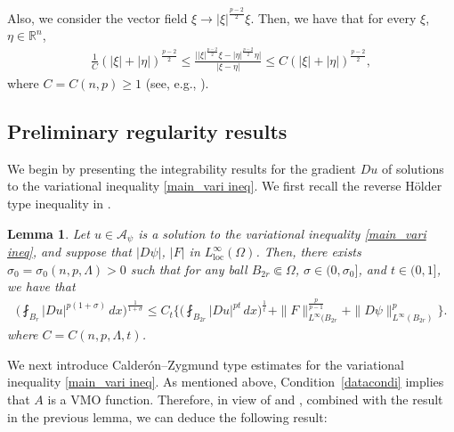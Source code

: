\documentclass[reqno]{amsart}
\numberwithin{equation}{section}
\theoremstyle{plain}
\newtheorem{lemma}[theorem]{Lemma}
\theoremstyle{definition}
\theoremstyle{remark}
\DeclareMathOperator{\loc}{loc}
\providecommand{\Biggset}[1]{\Biggl\{#1\Biggr\}}
\providecommand{\abs}[1]{\lvert#1\rvert}
\newcommand{\bR}{\mathbb{R}}
\begin{document}
Also, we consider the vector field $\xi \to \abs{\xi}^{\frac{p-2}{2}}\xi$. Then, we have that for every $\xi$, $\eta\in \bR^n$,
 \begin{align}\label{eq0130fri4}
 \frac{1}{C} (\abs{\xi}+\abs{\eta})^{\frac{p-2}{2}} \leq \frac{\big|\abs{\xi}^{\frac{p-2}{2}}\xi-\abs{\eta}^{\frac{p-2}{2}}\eta\big|}{\abs{\xi-\eta}}\leq C(\abs{\xi}+\abs{\eta})^{\frac{p-2}{2}},
 \end{align}
 where $C=C(n,p)\ge 1$ (see, e.g., \cite{KM14}).
 


 
\subsection{Preliminary regularity results}
We begin by presenting the integrability results for the gradient $Du$ of solutions to the variational inequality \eqref{main_vari ineq}. 
We first recall the reverse H\"{o}lder type inequality in \cite[Theorem~3.1]{Ok17}.
\begin{lemma}
Let $u\in \mathcal{A}_\psi$ is a solution to  the variational inequality \eqref{main_vari ineq},
and suppose that  $\abs{D\psi}$, $\abs{F} $ in $L^\infty_{\loc}(\Omega)$.
Then, there exists $\sigma_0=\sigma_0(n,p,\Lambda)>0$ such that for any ball $B_{2r}\Subset \Omega$, $\sigma\in (0,\sigma_0]$, and $t\in(0,1]$, we have that
\begin{align}\label{eq0330mon1}
\bigg(  \fint_{B_r} \abs{Du}^{p(1+\sigma)}\,dx \bigg)^{\frac{1}{1+\sigma}} \leq C_t  \Biggset{ \bigg( \fint_{B_{2r}} \abs{Du}^{pt} \, dx\bigg)^\frac{1}{t}+    \|F\|_{L^\infty(B_{2r}}^{\frac{p}{p-1}}  +\|D\psi\|_{L^\infty(B_{2r})}^p}.
\end{align}
where $C=C(n,p,\Lambda,t)$.
\end{lemma}


We next introduce Calder\'{o}n--Zygmund type estimates for the variational inequality \eqref{main_vari ineq}.
As mentioned above, Condition~\ref{datacondi} implies that $A$ is a \textsf{VMO} function. Therefore, in view of  \cite[Theorem~1.5]{BDM11} and \cite[Theorem~2.5]{BCW12}, combined with the result in the previous lemma, we can deduce the following result:
\end{document}
